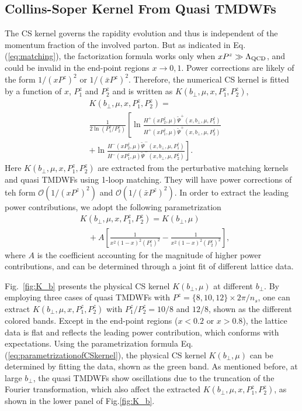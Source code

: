 \documentclass[prd,aps,twocolumn,preprintnumbers, showpacs, nofootinbib,superscriptaddress,notitlepage]{revtex4-1}
\newcommand\bl{\color{blue}}
\begin{document}
\subsection{Collins-Soper Kernel From Quasi TMDWFs}
\label{subsec:csresults}

{\bl The} CS kernel governs the rapidity evolution and thus is independent of the momentum fraction of the involved parton.  But as indicated in Eq.(\ref{eq:matching}), the factorization formula  works {\bl only when} $xP^z\gg \Lambda_{\rm QCD}$, and could be invalid  in the end-point {\bl regions $x\to0,1$. Power corrections are likely of the form $1/\left(xP^z\right)^2$ or $1/\left(\bar{x}P^z\right)^2$. Therefore,  the numerical CS kernel is fitted by a function of $x$, $P_1^z$ and $P_2^z$ and is written} as $K(b_{\perp},\mu,x,P^z_1,P^z_2)$,
\begin{align}
&K(b_{\perp},\mu,x,P^z_1,P^z_2) =\nonumber\\
&\frac{1}{2\ln(P_1^z/P_2^z)} \left[\ln\frac{H^{+}(xP_2^z,\mu)\tilde{\Psi}^{+}(x,b_{\perp},\mu,P_1^z)}{H^{+}(xP_1^z,\mu)\tilde{\Psi}^{+}(x,b_{\perp},\mu,P_2^z)}\right.  \nonumber\\
	&+\left.\ln\frac{H^{-}(xP_2^z,\mu)\tilde{\Psi}^{-}(x,b_{\perp},\mu,P_1^z)}{H^{-}(xP_1^z,\mu)\tilde{\Psi}^{-}(x,b_{\perp},\mu,P_2^z)}\right].
\end{align}
Here $K(b_{\perp},\mu,x,P^z_1,P^z_2)$ are extracted from the perturbative matching kernels and quasi TMDWFs {\bl using 1-loop matching. They will have power corrections of teh form} $\mathcal{O}\left(1/\left(xP^z\right)^2\right)$ and $\mathcal{O}\left(1/\left(\bar{x}P^z\right)^2\right)$. In order to extract the leading power contributions, we adopt  the following {\bl parametrization}
\begin{align}
&K(b_{\perp},\mu,x,P^z_1,P^z_2) = K(b_{\perp},\mu) \nonumber\\
&\quad+A\left[\frac{1}{x^2(1-x)^2(P^z_1)^2}-\frac{1}{x^2(1-x)^2(P^z_2)^2}\right], \label{eq:parametrizationofCSkernel}
\end{align}
where $A$ is the coefficient accounting for  the magnitude of higher power contributions, and can be determined through a joint fit of different lattice data.

Fig.~\ref{fig:K_b} presents {\bl the physical} CS kernel $K(b_{\perp},\mu)$ at different $b_{\perp}$. By employing three cases of quasi TMDWFs  with $P^z=\{8,10,12\}\times2\pi/n_s$, one can extract $K(b_{\perp},\mu,x,P^z_1,P^z_2)$ with $P_1^z/P_2^z=10/8$ and $12/8$, shown as the different colored bands.  Except in the end-point regions ($x<0.2$ or $x>0.8$), the {\bl lattice data is flat} and reflects the leading power contribution, which {\bl conforms with } expectations. Using the parametrization {\bl formula} Eq.(\ref{eq:parametrizationofCSkernel}), the physical CS kernel $K(b_{\perp},\mu)$ can be determined by fitting the data, shown as the {\bl green} band. As mentioned before, at large {\bl $b_{\perp}$, the quasi TMDWFs   show oscillations due to the  truncation of} the Fourier transformation, which also affect the extracted $K(b_{\perp},\mu,x,P^z_1,P^z_2)$, as shown in the lower panel of Fig.\ref{fig:K_b}. 
\end{document}
